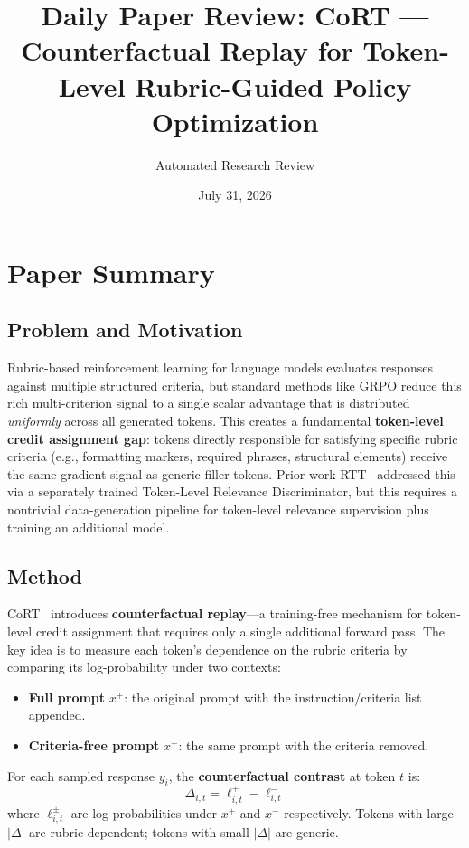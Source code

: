 \documentclass[11pt,a4paper]{article}
\title{Daily Paper Review: CoRT --- Counterfactual Replay for Token-Level Rubric-Guided Policy Optimization}
\author{Automated Research Review}
\date{July 31, 2026}
\begin{document}
\maketitle

\section{Paper Summary}

\subsection{Problem and Motivation}
Rubric-based reinforcement learning for language models evaluates responses against multiple structured criteria, but standard methods like GRPO reduce this rich multi-criterion signal to a single scalar advantage that is distributed \emph{uniformly} across all generated tokens. This creates a fundamental \textbf{token-level credit assignment gap}: tokens directly responsible for satisfying specific rubric criteria (e.g., formatting markers, required phrases, structural elements) receive the same gradient signal as generic filler tokens. Prior work RTT~\cite{rtt2025} addressed this via a separately trained Token-Level Relevance Discriminator, but this requires a nontrivial data-generation pipeline for token-level relevance supervision plus training an additional model.

\subsection{Method}
CoRT~\cite{zhang2026cort} introduces \textbf{counterfactual replay}---a training-free mechanism for token-level credit assignment that requires only a single additional forward pass. The key idea is to measure each token's dependence on the rubric criteria by comparing its log-probability under two contexts:
\begin{itemize}
    \item \textbf{Full prompt} $x^+$: the original prompt with the instruction/criteria list appended.
    \item \textbf{Criteria-free prompt} $x^-$: the same prompt with the criteria removed.
\end{itemize}

For each sampled response $y_i$, the \textbf{counterfactual contrast} at token $t$ is:
\begin{equation}
    \Delta_{i,t} = \ell^+_{i,t} - \ell^-_{i,t}
\end{equation}
where $\ell^{\pm}_{i,t}$ are log-probabilities under $x^+$ and $x^-$ respectively. Tokens with large $|\Delta|$ are rubric-dependent; tokens with small $|\Delta|$ are generic.
\end{document}
